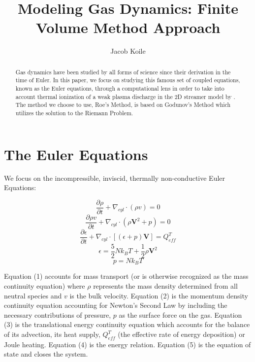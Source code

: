 \documentclass[]{article}
\title{Modeling Gas Dynamics: Finite Volume Method Approach}
\author{Jacob Koile}
\begin{document}
\maketitle

\begin{abstract}
	Gas dynamics have been studied by all forms of science since their derivation in the time of Euler. In this paper, we focus on studying this famous set of coupled equations, known as the Euler equations, through a computational lens in order to take into account thermal ionization of a weak plasma discharge in the 2D streamer model by \citet{Liu:2004b}. The method we choose to use, Roe's Method, is based on Godunov's Method which utilizes the solution to the Riemann Problem. 

\end{abstract}

\section{The Euler Equations}

	We focus on the incompressible, inviscid, thermally non-conductive Euler Equations:

	\begin{equation}
	\frac{\partial\rho}{\partial t} + \nabla_{cyl} \cdot (\rho v) = 0
	\end{equation} 
	\begin{equation}
	\frac{\partial \rho v}{\partial t} + \nabla_{cyl} \cdot (\rho \textbf{V}^2 + p) = 0   
	\end{equation}
	\begin{equation}
	\frac{\partial \epsilon}{\partial t} + \nabla_{cyl} \cdot [(\epsilon + p)\textbf{V}] = Q_{eff}^T  
	\end{equation}	 
	\begin{equation}
	\epsilon = \frac{5}{2} N k_B T + \frac{1}{2}\rho \textbf{V}^2 
	\end{equation}
	\begin{equation}
	p = N k_B T
	\end{equation}

	Equation (1) accounts for mass transport (or is otherwise recognized as the mass continuity equation) where $\rho$ represents the mass density determined from all neutral species and $v$ is the bulk velocity. Equation (2) is the momentum density continuity equation accounting for Newton's Second Law by including the necessary contributions of pressure, $p$ as the surface force on the gas. Equation (3) is the translational energy continuity equation which accounts for the balance of its advection, its heat supply, $Q_{eff}^T$ (the effective rate of energy deposition) or Joule heating. Equation (4) is the energy relation. Equation (5) is the equation of state and closes the system.
	
\end{document}

